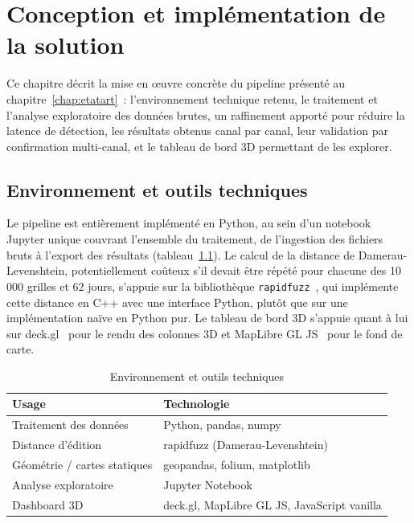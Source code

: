 \chapter{Conception et implémentation de la solution}
\label{chap:conception}

Ce chapitre décrit la mise en œuvre concrète du pipeline présenté au
chapitre~\ref{chap:etatart}~: l'environnement technique retenu, le
traitement et l'analyse exploratoire des données brutes, un
raffinement apporté pour réduire la latence de détection, les
résultats obtenus canal par canal, leur validation par confirmation
multi-canal, et le tableau de bord 3D permettant de les explorer.

\clearpage
\section{Environnement et outils techniques}

Le pipeline est entièrement implémenté en Python, au sein d'un
notebook Jupyter unique couvrant l'ensemble du traitement, de
l'ingestion des fichiers bruts à l'export des résultats
(tableau~\ref{tab:stack}). Le calcul de la distance de
Damerau-Levenshtein, potentiellement coûteux s'il devait être répété
pour chacune des 10 000 grilles et 62 jours, s'appuie sur la
bibliothèque \texttt{rapidfuzz}~\parencite{rapidfuzz2020github}, qui
implémente cette distance en C++ avec une interface Python, plutôt
que sur une implémentation naïve en Python pur. Le tableau de bord 3D
s'appuie quant à lui sur deck.gl~\parencite{deckgl2016site} pour le
rendu des colonnes 3D et MapLibre GL JS~\parencite{maplibre2021site}
pour le fond de carte.

\begin{table}[htbp]
  \centering
  \caption{Environnement et outils techniques}
  \label{tab:stack}
  \begin{tabular}{ll}
    \toprule
    \textbf{Usage} & \textbf{Technologie} \\
    \midrule
    Traitement des données        & Python, pandas, numpy \\
    Distance d'édition            & rapidfuzz (Damerau-Levenshtein) \\
    Géométrie / cartes statiques  & geopandas, folium, matplotlib \\
    Analyse exploratoire          & Jupyter Notebook \\
    Dashboard 3D                  & deck.gl, MapLibre GL JS, JavaScript vanilla \\
    \bottomrule
  \end{tabular}
\end{table}

